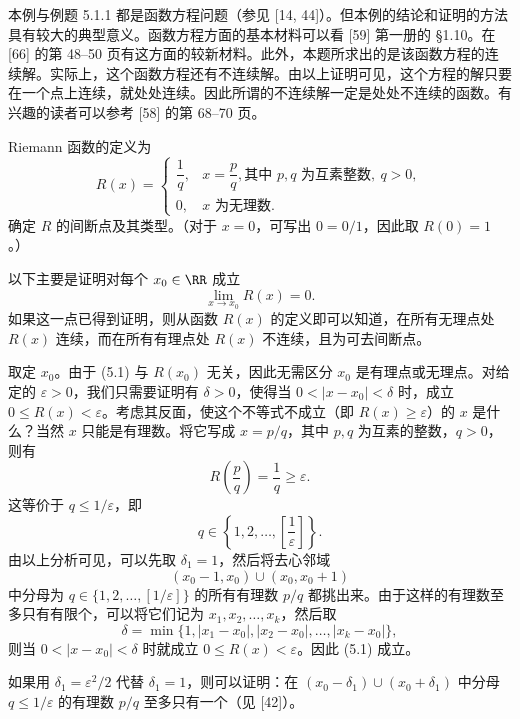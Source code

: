 \begin{xremark}
本例与例题 5.1.1 都是函数方程问题（参见 [14, 44]）。但本例的结论和证明的方法具有较大的典型意义。函数方程方面的基本材料可以看 [59] 第一册的 §1.10。在 [66] 的第 48--50 页有这方面的较新材料。此外，本题所求出的是该函数方程的连续解。实际上，这个函数方程还有不连续解。由以上证明可见，这个方程的解只要在一个点上连续，就处处连续。因此所谓的不连续解一定是处处不连续的函数。有兴趣的读者可以参考 [58] 的第 68--70 页。
\end{xremark}

\begin{xexample}
Riemann 函数的定义为
\[
  R(x)=\begin{cases}
    \dfrac1q,&x=\dfrac pq,\text{其中 }p,q\text{ 为互素整数},\ q>0,\\
    0,&x\text{ 为无理数}.
  \end{cases}
\]
确定 $R$ 的间断点及其类型。（对于 $x=0$，可写出 $0=0/1$，因此取 $R(0)=1$。）
\end{xexample}
\begin{xsolution}
以下主要是证明对每个 $x_0\in\RR$ 成立
\begin{equation}
  \lim_{x\to x_0}R(x)=0.
  \tag{5.1}
  \label{eq:5.1}
\end{equation}
如果这一点已得到证明，则从函数 $R(x)$ 的定义即可以知道，在所有无理点处 $R(x)$ 连续，而在所有有理点处 $R(x)$ 不连续，且为可去间断点。

取定 $x_0$。由于 (5.1) 与 $R(x_0)$ 无关，因此无需区分 $x_0$ 是有理点或无理点。对给定的 $\varepsilon>0$，我们只需要证明有 $\delta>0$，使得当 $0<|x-x_0|<\delta$ 时，成立 $0\le R(x)<\varepsilon$。考虑其反面，使这个不等式不成立（即 $R(x)\ge\varepsilon$）的 $x$ 是什么？当然 $x$ 只能是有理数。将它写成 $x=p/q$，其中 $p,q$ 为互素的整数，$q>0$，则有
\[
  R\left(\frac pq\right)=\frac1q\ge\varepsilon.
\]
这等价于 $q\le1/\varepsilon$，即
\[
  q\in\left\{1,2,\ldots,\left[\frac1\varepsilon\right]\right\}.
\]
由以上分析可见，可以先取 $\delta_1=1$，然后将去心邻域
\[
  (x_0-1,x_0)\cup(x_0,x_0+1)
\]
中分母为 $q\in\{1,2,\ldots,[1/\varepsilon]\}$ 的所有有理数 $p/q$ 都挑出来。由于这样的有理数至多只有有限个，可以将它们记为 $x_1,x_2,\ldots,x_k$，然后取
\[
  \delta=\min\{1,|x_1-x_0|,|x_2-x_0|,\ldots,|x_k-x_0|\},
\]
则当 $0<|x-x_0|<\delta$ 时就成立 $0\le R(x)<\varepsilon$。因此 (5.1) 成立。
\end{xsolution}

\begin{xremark}
如果用 $\delta_1=\varepsilon^2/2$ 代替 $\delta_1=1$，则可以证明：在 $(x_0-\delta_1)\cup(x_0+\delta_1)$ 中分母 $q\le1/\varepsilon$ 的有理数 $p/q$ 至多只有一个（见 [42]）。
\end{xremark}

